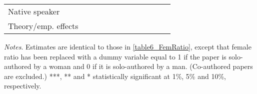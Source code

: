 \begin{sidewaystable}
\begin{threeparttable}
\begin{tabular}{p{3cm}S@{}S@{}S@{}S@{}S@{}S@{}S@{}S@{}S@{}S@{}S@{}}
            Native speaker                &               &           {}   &               &           {}   &               &           {}   &               &           {}   &               &               &               \\
            Theory/emp. effects           &               &           {}   &               &           {}   &               &           {}   &               &           {}   &               &               &               \\
            \bottomrule
        \end{tabular}
        \begin{tablenotes}
            \tiny
            \item \textit{Notes}. Estimates are identical to those in \autoref{table6_FemRatio}, except that female ratio has been replaced with a dummy variable equal to 1 if the paper is solo-authored by a woman and 0 if it is solo-authored by a man. (Co-authored papers are excluded.) ***, ** and * statistically significant at 1\%, 5\% and 10\%, respectively.
        \end{tablenotes}
    \end{threeparttable}

\end{sidewaystable}
